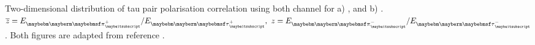 \begin{figure}[htbp]
\begin{subfigure}[t]{0.45\textwidth}
    \caption{\HiggsToTauTau}
    \label{fig:theoryTauPairCorrelationH}
  \end{subfigure}
\caption[Two-dimensional distribution of \ZToTauTau and \HiggsToTauTau.]
{Two-dimensional distribution of  tau pair polarisation correlation using both \tauToPion channel for a) \ZToTauTau, and b) \HiggsToTauTau.  $\overline{z} = {E_{\Ppiplus}}/{E_{\APtauon}},\ z = {E_{\Ppiminus}}/{E_{\Ptauon}}$. Both figures are adapted from reference \cite{Tsai:1971vv}.}
\label{fig:theoryTauPairCorrelation}
\end{figure} 